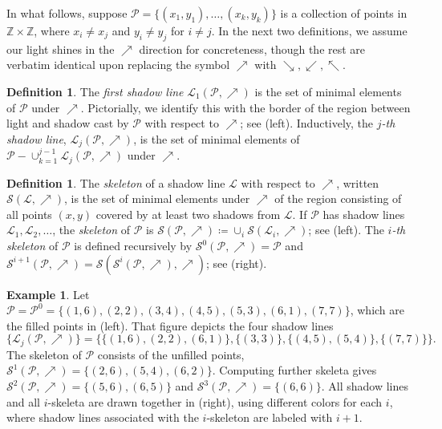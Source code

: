 \documentclass{amsart}
\theoremstyle{definition}
\newtheorem{definition}[theorem]{Definition}
\newtheorem{example}[theorem]{Example}
\begin{document}
In what follows, suppose $\mathcal{P} = \{(x_1, y_1), \ldots, (x_k, y_k)\}$ is a collection of points in $\mathbb{Z} \times \mathbb{Z}$, where $x_i \neq x_j$ and $y_i \neq y_j$ for $i \neq j$. In the next two definitions, we assume our light shines in the $\nearrow$ direction for concreteness, though the rest are verbatim identical upon replacing the symbol $\nearrow$ with $\searrow, \swarrow, \nwarrow$.

\begin{definition}
    The \emph{first shadow line} $\mathcal{L}_1(\mathcal{P}, \nearrow)$ is the set of minimal elements of $\mathcal{P}$ under $\nearrow$. Pictorially, we identify this with the border of the region between light and shadow cast by $\mathcal{P}$ with respect to $\nearrow$; see  (left). Inductively, the \emph{$j$-th shadow line}, $\mathcal{L}_j(\mathcal{P}, \nearrow)$, is the set of minimal elements of $\mathcal{P} - \cup_{k=1}^{j-1} \mathcal{L}_j(\mathcal{P}, \nearrow)$ under $\nearrow$.
\end{definition}

\begin{definition}
    The \emph{skeleton} of a shadow line $\mathcal{L}$ with respect to $\nearrow$, written $\mathcal{S}(\mathcal{L}, \nearrow)$, is the set of minimal elements under $\nearrow$ of the region consisting of all points $(x, y)$ covered by at least two shadows from $\mathcal{L}$. If $\mathcal{P}$ has shadow lines $\mathcal{L}_1, \mathcal{L}_2, \ldots$, the \emph{skeleton} of $\mathcal{P}$ is $\mathcal{S}(\mathcal{P}, \nearrow) \coloneqq \cup_i \mathcal{S}(\mathcal{L}_i, \nearrow)$; see  (left). The \emph{$i$-th skeleton} of $\mathcal{P}$ is defined recursively by $\mathcal{S}^0(\mathcal{P}, \nearrow) = \mathcal{P}$ and $\mathcal{S}^{i+1}(\mathcal{P}, \nearrow) = \mathcal{S}(\mathcal{S}^i(\mathcal{P}, \nearrow), \nearrow)$; see  (right).
\end{definition}

\begin{example}
    Let $\mathcal{P} = \mathcal{P}^0 = \{(1, 6), (2, 2), (3, 4), (4, 5), (5, 3), (6, 1), (7, 7)\}$, which are the filled points in  (left). That figure depicts the four shadow lines \[\{\mathcal{L}_j(\mathcal{P}, \nearrow)\} =  \{\{(1, 6), (2, 2), (6, 1)\}, \{(3, 3)\}, \{(4, 5), (5, 4)\}, \{(7, 7)\}\}.\] The skeleton of $\mathcal{P}$ consists of the unfilled points, $\mathcal{S}^1(\mathcal{P}, \nearrow) = \{(2, 6), (5, 4), (6, 2)\}$. Computing further skeleta gives $\mathcal{S}^2(\mathcal{P}, \nearrow) = \{(5, 6), (6, 5)\}$ and $\mathcal{S}^3(\mathcal{P}, \nearrow) = \{(6, 6)\}$. All shadow lines and all $i$-skeleta are drawn together in  (right), using different colors for each $i$, where shadow lines associated with the $i$-skeleton are labeled with $i+1$.
\end{example}
\end{document}
